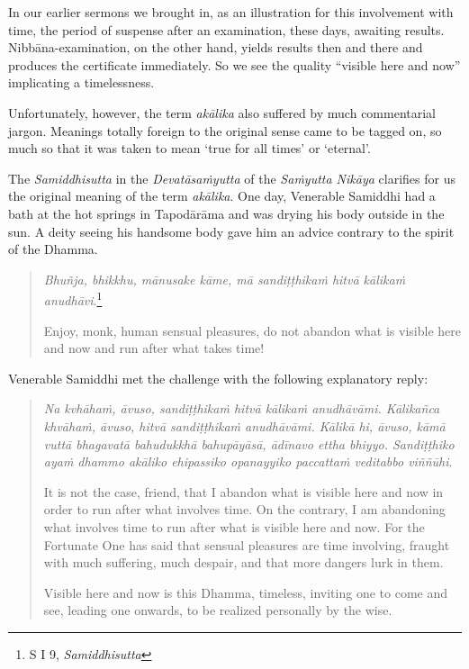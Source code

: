 In our earlier sermons we brought in, as an illustration for this involvement with time, the period of suspense after an examination, these days, awaiting results. Nibbāna-examination, on the other hand, yields results then and there and produces the certificate immediately. So we see the quality ``visible here and now'' implicating a timelessness.

Unfortunately, however, the term \emph{akālika} also suffered by much commentarial jargon. Meanings totally foreign to the original sense came to be tagged on, so much so that it was taken to mean `true for all times' or `eternal'.

The \emph{Samiddhisutta} in the \emph{Devatāsaṁyutta} of the \emph{Saṁyutta Nikāya} clarifies for us the original meaning of the term \emph{akālika}. One day, Venerable Samiddhi had a bath at the hot springs in Tapodārāma and was drying his body outside in the sun. A deity seeing his handsome body gave him an advice contrary to the spirit of the Dhamma.

\begin{quote}
\emph{Bhuñja, bhikkhu, mānusake kāme, mā sandiṭṭhikaṁ hitvā kālikaṁ anudhāvi}.\footnote{S I 9, \emph{Samiddhisutta}}

Enjoy, monk, human sensual pleasures, do not abandon what is visible here and now and run after what takes time!
\end{quote}

Venerable Samiddhi met the challenge with the following explanatory reply:

\begin{quote}
\emph{Na kvhāhaṁ, āvuso, sandiṭṭhikaṁ hitvā kālikaṁ anudhāvāmi. Kālikañca khvāhaṁ, āvuso, hitvā sandiṭṭhikaṁ anudhāvāmi. Kālikā hi, āvuso, kāmā vuttā bhagavatā bahudukkhā bahupāyāsā, ādīnavo ettha bhiyyo. Sandiṭṭhiko ayaṁ dhammo akāliko ehipassiko opanayyiko paccattaṁ veditabbo viññūhi}.

It is not the case, friend, that I abandon what is visible here and now in order to run after what involves time. On the contrary, I am abandoning what involves time to run after what is visible here and now. For the Fortunate One has said that sensual pleasures are time involving, fraught with much suffering, much despair, and that more dangers lurk in them.

Visible here and now is this Dhamma, timeless, inviting one to come and see, leading one onwards, to be realized personally by the wise.
\end{quote}


